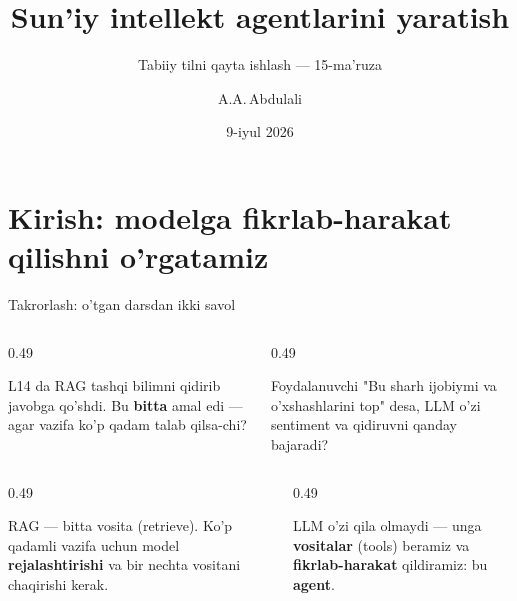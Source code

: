 \documentclass[aspectratio=169,11pt]{beamer}
\title[Agentlar]{Sun'iy intellekt agentlarini yaratish}
\subtitle{Tabiiy tilni qayta ishlash --- 15-ma'ruza}
\author[A.A.\,Abdulali]{A.A.\,Abdulali}
\date{9-iyul 2026}
\institute{11:00--12:20 \quad$\cdot$\quad mavzu \textnumero{}15}
\begin{document}

\maketitle

\section[Kirish]{Kirish: modelga fikrlab-harakat qilishni o'rgatamiz}

\begin{frame}{Takrorlash: o'tgan darsdan ikki savol}
  \begin{columns}[T]
    \begin{column}{0.49\textwidth}
      \begin{tcolorbox}[warnbox,title=1-savol]
        \small
        L14 da RAG tashqi bilimni qidirib javobga qo'shdi. Bu \textbf{bitta}
        amal edi --- agar vazifa ko'p qadam talab qilsa-chi?
      \end{tcolorbox}
    \end{column}
    \begin{column}{0.49\textwidth}
      \begin{tcolorbox}[warnbox,title=2-savol]
        \small
        Foydalanuvchi "Bu sharh ijobiymi va o'xshashlarini top" desa, LLM o'zi
        sentiment va qidiruvni qanday bajaradi?
      \end{tcolorbox}
    \end{column}
  \end{columns}
  \pause
  \vspace{4pt}
  \begin{columns}[T]
    \begin{column}{0.49\textwidth}
      \begin{tcolorbox}[okbox,title=1-javob]
        \small
        RAG --- bitta vosita (retrieve). Ko'p qadamli vazifa uchun model
        \textbf{rejalashtirishi} va bir nechta vositani chaqirishi kerak.
      \end{tcolorbox}
    \end{column}
    \begin{column}{0.49\textwidth}
      \begin{tcolorbox}[okbox,title=2-javob]
        \small
        LLM o'zi qila olmaydi --- unga \textbf{vositalar} (tools) beramiz va
        \textbf{fikrlab-harakat} qildiramiz: bu \textbf{agent}.
      \end{tcolorbox}
    \end{column}
  \end{columns}
\end{frame}
\end{document}
